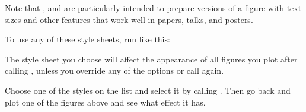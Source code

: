 \documentclass[letterpaper,10pt,english]{sphinxmanual}
\begin{document}
\begin{sphinxVerbatim}
\end{sphinxVerbatim}

Note that ,  and  are particularly intended to prepare versions of a figure with text sizes and other features that work well in papers, talks, and posters.

To use any of these style sheets, run  like this:

\begin{sphinxVerbatim}[commandchars=\\\{\}]
\end{sphinxVerbatim}

The style sheet you choose will affect the appearance of all figures you plot after calling , unless you override any of the options or call  again.

 Choose one of the styles on the list and select it by calling .  Then go back and plot one of the figures above and see what effect it has.
\end{document}

